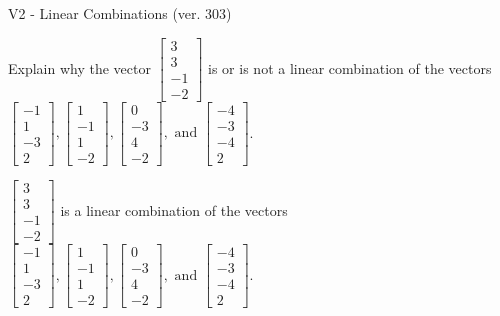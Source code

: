 \begin{exercise}
  \begin{exerciseTitle}V2 - Linear Combinations (ver. 303)\end{exerciseTitle}
  \begin{exerciseStatement}
    Explain why the vector \(\left[\begin{array}{c}
3 \\
3 \\
-1 \\
-2
\end{array}\right]\)  is or is not a linear 
	combination of the vectors \(\left[\begin{array}{c}
-1 \\
1 \\
-3 \\
2
\end{array}\right] , \left[\begin{array}{c}
1 \\
-1 \\
1 \\
-2
\end{array}\right] , \left[\begin{array}{c}
0 \\
-3 \\
4 \\
-2
\end{array}\right] , \text{ and } \left[\begin{array}{c}
-4 \\
-3 \\
-4 \\
2
\end{array}\right]\).
	


  \end{exerciseStatement}
  \begin{exerciseAnswer}
   \(\left[\begin{array}{c}
3 \\
3 \\
-1 \\
-2
\end{array}\right]\) 
  	 is  
	a linear combination of the vectors \(\left[\begin{array}{c}
-1 \\
1 \\
-3 \\
2
\end{array}\right] , \left[\begin{array}{c}
1 \\
-1 \\
1 \\
-2
\end{array}\right] , \left[\begin{array}{c}
0 \\
-3 \\
4 \\
-2
\end{array}\right] , \text{ and } \left[\begin{array}{c}
-4 \\
-3 \\
-4 \\
2
\end{array}\right]\).


\end{exerciseAnswer}
\end{exercise}
